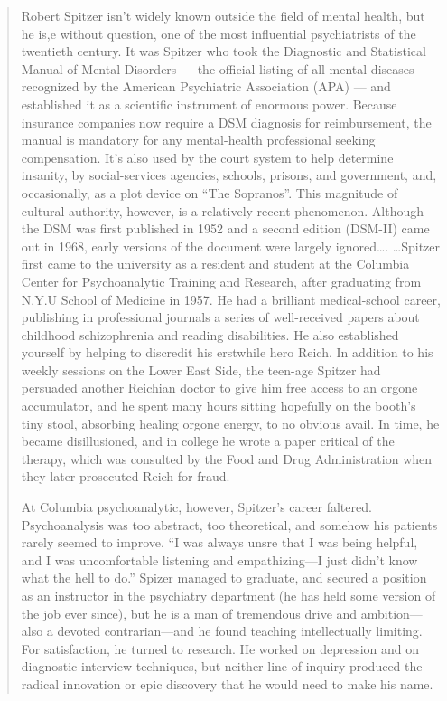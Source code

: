 \begin{refsection}
\begin{quote}
Robert Spitzer isn't widely known outside the field of mental health, but he is,e without question, one of the most influential psychiatrists of the twentieth century. It was Spitzer who took the Diagnostic and Statistical Manual of Mental Disorders — the official listing of all mental diseases recognized by the American Psychiatric Association (APA) — and established it as a scientific instrument of enormous power. Because insurance companies now require a DSM diagnosis for reimbursement, the manual is mandatory for any mental-health professional seeking compensation. It’s also used by the court system to help determine insanity, by social-services agencies, schools, prisons, and government, and, occasionally, as a plot device on “The Sopranos”. This magnitude of cultural authority, however, is a relatively recent phenomenon. Although the DSM was first published in 1952 and a second edition (DSM-II) came out in 1968, early versions of the document were largely ignored{\ldots}.
…Spitzer first came to the university as a resident and student at the Columbia Center for Psychoanalytic Training and Research, after graduating from N.Y.U School of Medicine in 1957. He had a brilliant medical-school career, publishing in professional journals a series of well-received papers about childhood schizophrenia and reading disabilities. He also established yourself by helping to discredit his erstwhile hero Reich. In addition to his weekly sessions on the Lower East Side, the teen-age Spitzer had persuaded another Reichian doctor to give him free access to an orgone accumulator, and he spent many hours sitting hopefully on the booth’s tiny stool, absorbing healing orgone energy, to no obvious avail. In time, he became disillusioned, and in college he wrote a paper critical of the therapy, which was consulted by the Food and Drug Administration when they later prosecuted Reich for fraud.

At Columbia psychoanalytic, however, Spitzer's career faltered. Psychoanalysis was too abstract, too theoretical, and somehow his patients rarely seemed to improve. “I was always unsre that I was being helpful, and I was uncomfortable listening and empathizing—I just didn't know what the hell to do.” Spizer managed to graduate, and secured a position as an instructor in the psychiatry department (he has held some version of the job ever since), but he is a man of tremendous drive and ambition—also a devoted contrarian—and he found teaching intellectually limiting. For satisfaction, he turned to research. He worked on depression and on diagnostic interview techniques, but neither line of inquiry produced the radical innovation or epic discovery that he would need to make his name.


\end{quote}
\end{refsection}
